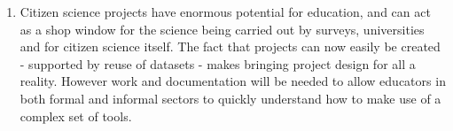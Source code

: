 \documentclass{pasa}
\begin{document}
\begin{enumerate}
\item Citizen science projects have enormous potential for education, and can act as a shop window for the science being carried out by surveys, universities and for citizen science itself. The fact that projects can now easily be created - supported by reuse of datasets - makes bringing project design for all a reality. However work and documentation will be needed to allow educators in both formal and informal sectors to quickly understand how to make use of a complex set of tools. 

\end{enumerate} 
\end{document}

